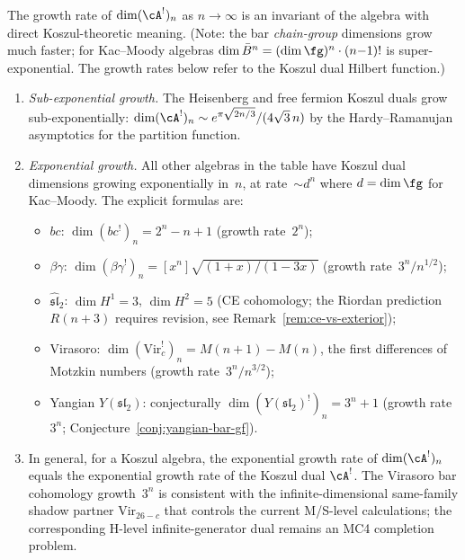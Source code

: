 \begin{remark}\label{rem:bar-growth-koszul}
The growth rate of $\dim (\cA^!)_n$ as $n \to \infty$ is
an invariant of the algebra with direct Koszul-theoretic meaning.
(Note: the bar \emph{chain-group} dimensions grow much faster;
for Kac--Moody algebras $\dim \bar{B}^n = (\dim\fg)^n \cdot (n{-}1)!$
is super-exponential.  The growth rates below refer to
the Koszul dual Hilbert function.)
\begin{enumerate}
\item \emph{Sub-exponential growth.}
  The Heisenberg and free fermion Koszul duals grow
  sub-exponentially: $\dim (\cA^!)_n \sim
  e^{\pi\sqrt{2n/3}}/(4\sqrt{3}\,n)$ by the
  Hardy--Ramanujan asymptotics for the partition function.
\item \emph{Exponential growth.}
  All other algebras in the table have Koszul dual dimensions growing
  exponentially in~$n$, at rate~$\sim d^n$ where $d = \dim\fg$
  for Kac--Moody.
  The explicit formulas are:
  \begin{itemize}
  \item $bc$: $\dim (bc^!)_n = 2^n - n + 1$
    (growth rate~$2^n$);
  \item $\beta\gamma$: $\dim (\beta\gamma^!)_n = [x^n]\sqrt{(1{+}x)/(1{-}3x)}$
    (growth rate~$3^n/n^{1/2}$);
  \item $\widehat{\mathfrak{sl}}_2$:
    $\dim H^1 = 3$, $\dim H^2 = 5$ (CE cohomology;
    the Riordan prediction $R(n{+}3)$ requires revision,
    see Remark~\ref{rem:ce-vs-exterior});
  \item Virasoro: $\dim (\mathrm{Vir}_c^!)_n = M(n{+}1) - M(n)$,
    the first differences of Motzkin numbers
    (growth rate~$3^n/n^{3/2}$);
  \item Yangian $Y(\mathfrak{sl}_2)$: conjecturally
    $\dim (Y(\mathfrak{sl}_2)^!)_n = 3^n + 1$ (growth rate~$3^n$;
    Conjecture~\ref{conj:yangian-bar-gf}).
  \end{itemize}
\item In general, for a Koszul algebra, the exponential
  growth rate of $\dim (\cA^!)_n$ equals the
  exponential growth rate of the Koszul dual $\cA^!$.
  The Virasoro bar cohomology growth~$3^n$ is consistent
  with the infinite-dimensional same-family shadow partner
  $\mathrm{Vir}_{26-c}$ that controls the current M/S-level
  calculations; the corresponding H-level infinite-generator dual
  remains an MC4 completion problem.
\end{enumerate}
\end{remark}

